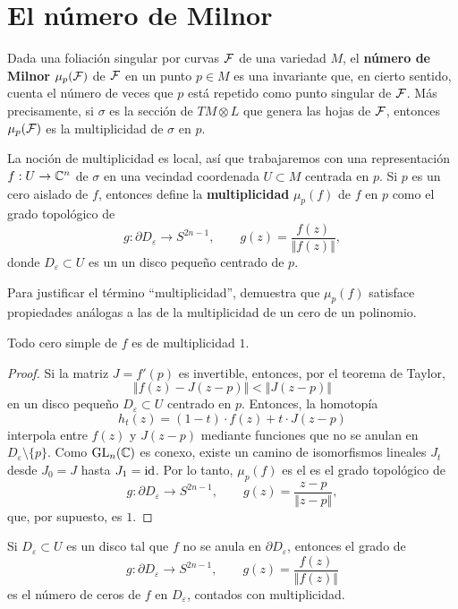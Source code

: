 \section{El número de Milnor}

Dada una foliación singular por curvas $\mathcal F$ de una variedad $M$, el \textbf{número de Milnor} $\mu_p(\mathcal F)$ de $\mathcal F$ en un punto $p \in M$ es una invariante que, en cierto sentido, cuenta el número de veces que $p$ está repetido como punto singular de $\mathcal F$. Más precisamente, si $\sigma$ es la sección de $TM \otimes L$ que genera las hojas de $\mathcal F$, entonces $\mu_p(\mathcal F)$ es la multiplicidad de $\sigma$ en $p$.

La noción de multiplicidad es local, así que trabajaremos con una representación $f : U \to \mathbb C^n$ de $\sigma$ en una vecindad coordenada $U \subset M$ centrada en $p$. Si $p$ es un cero aislado de $f$, entonces \cite[p. 59]{milnor2} define la \textbf{multiplicidad} $\mu_p(f)$ de $f$ en $p$ como el grado topológico de
$$g : \partial D_\varepsilon \longrightarrow S^{2n-1}, \qquad g(z) = \dfrac {f(z)} {\Vert f(z) \Vert},$$
donde $D_\varepsilon \subset U$ es un un disco pequeño centrado de $p$.

Para justificar el término ``multiplicidad'', \cite[pp. 111-114]{milnor2} demuestra que $\mu_p(f)$ satisface propiedades análogas a las de la multiplicidad de un cero de un polinomio.

\begin{lemma}
Todo cero simple de $f$ es de multiplicidad $1$.
\end{lemma}

\begin{proof}
Si la matriz $J = f'(p)$ es invertible, entonces, por el teorema de Taylor,
$$\Vert f(z) - J(z - p) \Vert < \Vert J(z - p) \Vert$$
en un disco pequeño $D_\varepsilon \subset U$ centrado en $p$. Entonces, la homotopía
$$h_t(z) = (1 - t) \cdot f(z) + t \cdot J(z - p)$$
interpola entre $f(z)$ y $J(z - p)$ mediante funciones que no se anulan en $D_\varepsilon \setminus \{ p \}$. Como $\operatorname{GL}_n(\mathbb C)$ es conexo, existe un camino de isomorfismos lineales $J_t$ desde $J_0 = J$ hasta $J_1 = \operatorname{id}$. Por lo tanto, $\mu_p(f)$ es el es el grado topológico de
$$g : \partial D_\varepsilon \longrightarrow S^{2n-1}, \qquad g(z) = \dfrac {z - p} {\Vert z - p \Vert},$$
que, por supuesto, es $1$.
\end{proof}

\begin{lemma}
Si $D_\varepsilon \subset U$ es un disco tal que $f$ no se anula en $\partial D_\varepsilon$, entonces el grado de
$$g : \partial D_\varepsilon \longrightarrow S^{2n-1}, \qquad g(z) = \dfrac {f(z)} {\Vert f(z) \Vert}$$
es el número de ceros de $f$ en $D_\varepsilon$, contados con multiplicidad.
\end{lemma}

